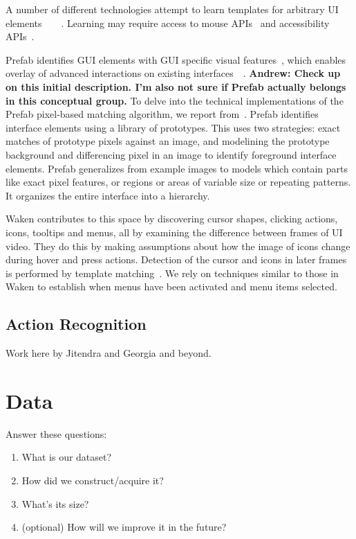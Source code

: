 \documentclass[12pt]{memoir}
\begin{document}
A number of different technologies attempt to learn templates for arbitrary UI 
elements~\cite{chang_associating_2011}~\cite{dixon_prefab_2010}~\cite{hurst_automatically_2010}~\cite{matejka_ambient_2011}.
Learning may require access to mouse APIs~\cite{hurst_automatically_2010}
and accessibility APIs~\cite{chang_associating_2011}.

Prefab identifies GUI elements with GUI specific visual features~\cite{dixon_prefab_2010}, which 
enables overlay of advanced interactions on existing interfaces~\cite{dixon_content_2011}~\cite{dixon_general-purpose_2012}.
\textbf{Andrew: Check up on this initial description.  I'm also not sure
if Prefab actually belongs in this conceptual group.}
To delve into the technical implementations of the Prefab pixel-based 
matching algorithm, we report from~\cite{dixon_general-purpose_2012}.
Prefab identifies interface elements using a library of prototypes.  
This uses two strategies: exact matches of prototype pixels against an image,
and modelining the prototype background and differencing pixel in an image 
to identify foreground interface elements.  
Prefab generalizes from example images to models which contain parts like 
exact pixel features, or regions or areas of variable size or repeating 
patterns.  It organizes the entire interface into a hierarchy.

Waken contributes to this space by discovering 
cursor shapes, clicking actions, icons, tooltips and menus, all by examining 
the difference between frames of UI video.  They do this by making assumptions 
about how the image of icons change during hover and press actions.  Detection 
of the cursor and icons in later frames is performed by template matching~\cite{banovic_waken_2012}.
We rely on techniques similar to those in Waken to establish when menus
have been activated and menu items selected.

\subsection{Action Recognition}

Work here by Jitendra and Georgia and beyond.

\section{Data}

Answer these questions:
\begin{enumerate}[noitemsep]
\item What is our dataset?
\item How did we construct/acquire it?
\item What's its size?
\item (optional) How will we improve it in the future?
\end{enumerate}
\end{document}
